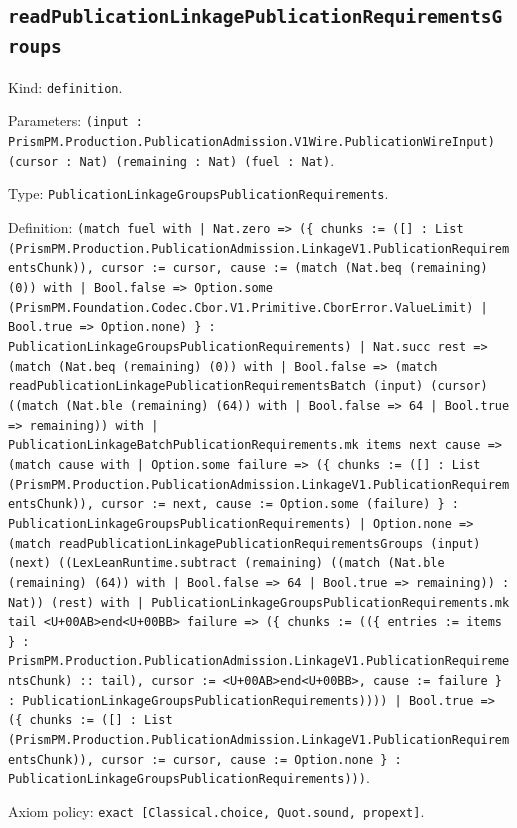\documentclass[11pt]{article}
\begin{document}
\subsection*{\texttt{readPublicationLinkagePublicationRequirementsGroups}}
\noindent Kind: \texttt{definition}.\par
\noindent Parameters: \texttt{(input : PrismPM.Production.PublicationAdmission.V1Wire.PublicationWireInput) (cursor : Nat) (remaining : Nat) (fuel : Nat)}.\par
\noindent Type: \texttt{PublicationLinkageGroupsPublicationRequirements}.\par
\noindent Definition: \texttt{(match fuel with | Nat.zero => (\{ chunks := ([] : List (PrismPM.Production.PublicationAdmission.LinkageV1.PublicationRequirementsChunk)), cursor := cursor, cause := (match (Nat.beq (remaining) (0)) with | Bool.false => Option.some (PrismPM.Foundation.Codec.Cbor.V1.Primitive.CborError.ValueLimit) | Bool.true => Option.none) \} : PublicationLinkageGroupsPublicationRequirements) | Nat.succ rest => (match (Nat.beq (remaining) (0)) with | Bool.false => (match readPublicationLinkagePublicationRequirementsBatch (input) (cursor) ((match (Nat.ble (remaining) (64)) with | Bool.false => 64 | Bool.true => remaining)) with | PublicationLinkageBatchPublicationRequirements.mk items next cause => (match cause with | Option.some failure => (\{ chunks := ([] : List (PrismPM.Production.PublicationAdmission.LinkageV1.PublicationRequirementsChunk)), cursor := next, cause := Option.some (failure) \} : PublicationLinkageGroupsPublicationRequirements) | Option.none => (match readPublicationLinkagePublicationRequirementsGroups (input) (next) ((LexLeanRuntime.subtract (remaining) ((match (Nat.ble (remaining) (64)) with | Bool.false => 64 | Bool.true => remaining)) : Nat)) (rest) with | PublicationLinkageGroupsPublicationRequirements.mk tail <U+00AB>end<U+00BB> failure => (\{ chunks := ((\{ entries := items \} : PrismPM.Production.PublicationAdmission.LinkageV1.PublicationRequirementsChunk) :: tail), cursor := <U+00AB>end<U+00BB>, cause := failure \} : PublicationLinkageGroupsPublicationRequirements)))) | Bool.true => (\{ chunks := ([] : List (PrismPM.Production.PublicationAdmission.LinkageV1.PublicationRequirementsChunk)), cursor := cursor, cause := Option.none \} : PublicationLinkageGroupsPublicationRequirements)))}.\par
\noindent Axiom policy: \texttt{exact [Classical.choice, Quot.sound, propext]}.\par
\end{document}
